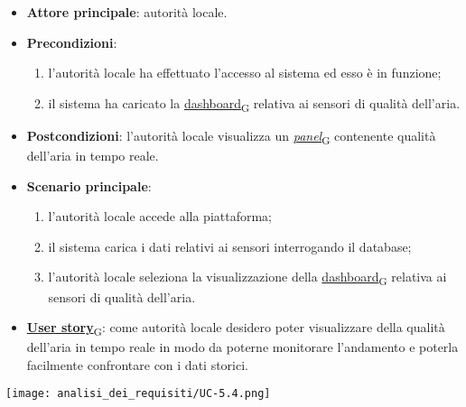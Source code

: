 \newpage

\begin{itemize}
	\item \textbf{Attore principale}: autorità locale.
	\item \textbf{Precondizioni}:
	      \begin{enumerate}
		      \item l'autorità locale ha effettuato l'accesso al sistema ed esso è in funzione;
		      \item il sistema ha caricato la \href{https://7last.github.io/docs/rtb/documentazione-interna/glossario\#dashboard}{dashboard\textsubscript{G}} relativa ai sensori di qualità dell'aria.
	      \end{enumerate}
	\item \textbf{Postcondizioni}: l'autorità locale visualizza un \href{https://7last.github.io/docs/rtb/documentazione-interna/glossario\#panel}{\textit{panel}\textsubscript{G}} contenente qualità dell'aria in tempo reale.
	\item \textbf{Scenario principale}:
	      \begin{enumerate}
		      \item l'autorità locale accede alla piattaforma;
		      \item il sistema carica i dati relativi ai sensori interrogando il database;
		      \item l'autorità locale seleziona la visualizzazione della \href{https://7last.github.io/docs/rtb/documentazione-interna/glossario\#dashboard}{dashboard\textsubscript{G}} relativa ai sensori di qualità dell'aria.
	      \end{enumerate}
	\item \href{https://7last.github.io/docs/rtb/documentazione-interna/glossario\#user-story}{\textbf{User story}\textsubscript{G}}:
	      come autorità locale desidero poter visualizzare della qualità dell'aria in tempo reale in modo da poterne monitorare l'andamento
	      e poterla facilmente confrontare con i dati storici.
\end{itemize}
\begin{center}
	\texttt{[image: analisi\_dei\_requisiti/UC-5.4.png]}
\end{center}
